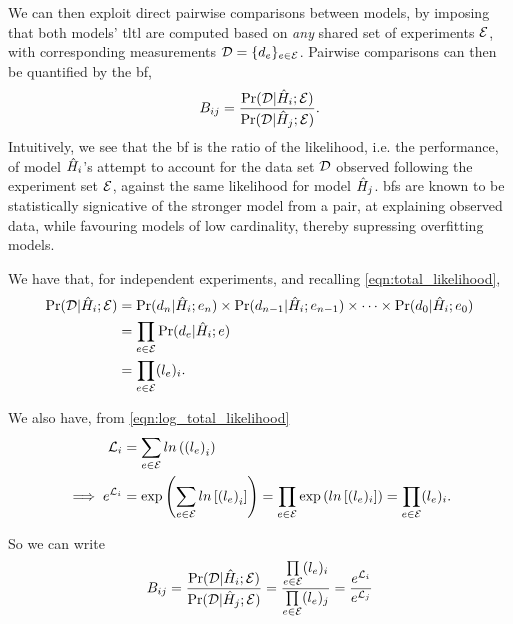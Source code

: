 We can then exploit direct pairwise comparisons between models,  
    by imposing that both models' \gls{tltl} are computed based 
    on \emph{any} shared set of experiments ${ \mathcal{E} }$, 
    with corresponding measurements ${ \mathcal{D} } = \{ d_{e}\}_{e \in { \mathcal{E} }}$.
Pairwise comparisons can then be quantified by the \gls{bf},
\begin{equation}
    \label{eqn:bayes_factors}
    B_{ij} = \frac{\Pr({ \mathcal{D} } | \hat{H}_i; { \mathcal{E} })}{\Pr({ \mathcal{D} } | \hat{H}_j; { \mathcal{E} })}.
\end{equation}
Intuitively, we see that the \gls{bf} is the ratio of the likelihood, i.e. the performance, 
    of model $\hat{H}_i$'s attempt to account for the data set ${ \mathcal{D} }$ observed following the 
    experiment set ${ \mathcal{E} }$, against the same \gls{likelihood} for model $\hat{H}_j$.
\glspl{bf} are known to be statistically signicative of the stronger model 
    from a pair, at explaining observed data,
    while favouring models of low cardinality, thereby supressing overfitting models. 
\par 

We have that, for independent experiments, and recalling \cref{eqn:total_likelihood}, 
\begin{align}
    \begin{split}
        \Pr({ \mathcal{D} } | \hat{H}_i; { \mathcal{E} }) &= \Pr(d_n | \hat{H}_i; e_n) \times \Pr(d_{n-1} | \hat{H}_i; e_{n-1}) \times \dots \times \Pr(d_0 | \hat{H}_i; e_0) \\
        &= \prod_{e \in { \mathcal{E} }} \Pr(d_e | \hat{H}_i; e) \\
        &= \prod_{e \in { \mathcal{E} }} (l_{e})_i.
    \end{split}
\end{align}

We also have, from \cref{eqn:log_total_likelihood}
\begin{align}
    \label{eqn:log_likelihood}
    \begin{split}
        {\mathcal{L}}_{i} &= \sum_{e \in { \mathcal{E} }} ln\left(\left(l_{e}\right)_i\right) \\
        \implies e^{{\mathcal{L}}_{i}} &= \exp \left( \sum_{e \in { \mathcal{E} }} ln \left[ \left(l_{e}\right)_i\right] \right) 
        = \prod_{e \in { \mathcal{E} }} \exp \left( ln \left[ (l_{e})_i \right]  \right) 
        = \prod_{e \in { \mathcal{E} }} (l_{e})_i.
    \end{split}
\end{align}

So we can write 
\begin{align}
    \label{eqn:bf_by_ll}
    \begin{split}
        B_{ij} &= \frac{\Pr({ \mathcal{D} } | \hat{H}_i; { \mathcal{E} })}{\Pr({ \mathcal{D} } | \hat{H}_j; { \mathcal{E} })} 
        = \frac{ \prod\limits_{e \in { \mathcal{E} }} (l_{e})_i } {\prod\limits_{e \in { \mathcal{E} }} (l_{e})_j } 
        = \frac{e^{{\mathcal{L}}_{i}}}{e^{{\mathcal{L}}_{j}}} \\
    \end{split}
\end{align}

